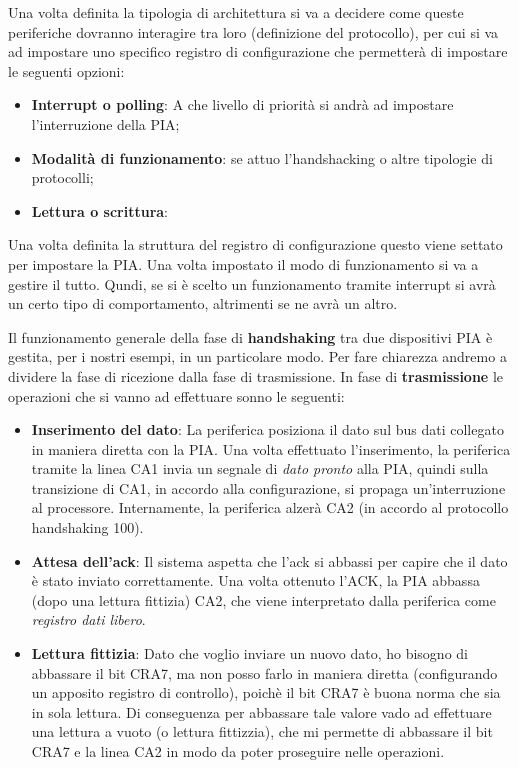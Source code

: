 Una volta definita la tipologia di architettura si va a decidere come queste periferiche dovranno interagire tra loro (definizione del protocollo), per cui si va ad impostare uno specifico registro di configurazione che permetterà di impostare le seguenti opzioni:

\begin{itemize}
    \item \textbf{Interrupt o polling}: A che livello di priorità si andrà ad impostare l'interruzione della PIA;
    \item \textbf{Modalità di funzionamento}: se attuo l'handshacking o altre tipologie di protocolli;
    \item \textbf{Lettura o scrittura}: 

 
\end{itemize}
Una volta definita la struttura del registro di configurazione questo viene settato per impostare la PIA. 
Una volta impostato il modo di funzionamento si va a gestire il tutto. Qundi, se si è scelto un funzionamento tramite interrupt si avrà un certo tipo di comportamento, altrimenti se ne avrà un altro.

Il funzionamento generale della fase di \textbf{handshaking} tra due dispositivi PIA è gestita, per i nostri esempi, in un particolare modo.
Per fare chiarezza andremo a dividere la fase di ricezione dalla fase di trasmissione.
In fase di \textbf{trasmissione} le operazioni che si vanno ad effettuare sonno le seguenti:
\begin{itemize}
    \item \textbf{Inserimento del dato}: La periferica posiziona il dato sul bus dati collegato in maniera diretta con la PIA. Una volta effettuato l'inserimento, la periferica tramite la linea CA1 invia un segnale di \textit{dato pronto} alla PIA, quindi sulla transizione di CA1, in accordo alla configurazione, si propaga un'interruzione al processore. Internamente, la periferica alzerà CA2 (in accordo al protocollo handshaking 100).
    \item \textbf{Attesa dell'ack}: Il sistema aspetta che l'ack si abbassi per capire che il dato è stato inviato correttamente. Una volta ottenuto l'ACK, la PIA abbassa (dopo una lettura fittizia) CA2, che viene interpretato dalla periferica come \textit{registro dati libero}.
    \item \textbf{Lettura fittizia}: Dato che voglio inviare un nuovo dato, ho bisogno di abbassare il bit CRA7, ma non posso farlo in maniera diretta (configurando un apposito registro di controllo), poichè il bit CRA7 è buona norma che sia in sola lettura. Di conseguenza per abbassare tale valore vado ad effettuare una lettura a vuoto (o lettura fittizzia), che mi permette di abbassare il bit CRA7 e la linea CA2 in modo da poter proseguire nelle operazioni.
\end{itemize}

